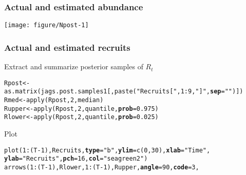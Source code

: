 \documentclass[color=usenames,dvipsnames]{beamer}\usepackage[]{graphicx}\usepackage[]{color}
\makeatletter
\newcommand{\hlnum}[1]{\textcolor[rgb]{0.69,0.494,0}{#1}}%
\newcommand{\hlstr}[1]{\textcolor[rgb]{0.749,0.012,0.012}{#1}}%
\newcommand{\hlopt}[1]{\textcolor[rgb]{0,0,0}{#1}}%
\newcommand{\hlstd}[1]{\textcolor[rgb]{0,0,0}{#1}}%
\newcommand{\hlkwb}[1]{\textcolor[rgb]{0,0.341,0.682}{#1}}%
\newcommand{\hlkwc}[1]{\textcolor[rgb]{0,0,0}{\textbf{#1}}}%
\newcommand{\hlkwd}[1]{\textcolor[rgb]{0.004,0.004,0.506}{#1}}%
\newenvironment{kframe}{%
 \def\at@end@of@kframe{}%
 \ifinner\ifhmode%
  \def\at@end@of@kframe{\end{minipage}}%
  \begin{minipage}{\columnwidth}%
 \fi\fi%
 \def\FrameCommand##1{\hskip\@totalleftmargin \hskip-\fboxsep
 \colorbox{shadecolor}{##1}\hskip-\fboxsep
     \hskip-\linewidth \hskip-\@totalleftmargin \hskip\columnwidth}%
 \MakeFramed {\advance\hsize-\width
   \@totalleftmargin\z@ \linewidth\hsize
   \@setminipage}}%
 {\par\unskip\endMakeFramed%
 \at@end@of@kframe}
\newenvironment{knitrout}{}{} %
\makeatother
\begin{document}
\begin{frame}
  \frametitle{Actual and estimated abundance}
  \begin{center}
    \texttt{[image: figure/Npost-1]}
  \end{center}
\end{frame}






\begin{frame}[fragile]
  \frametitle{Actual and estimated recruits}
  Extract and summarize posterior samples of $R_t$
\begin{knitrout}\scriptsize
{}\color{fgcolor}\begin{kframe}
\begin{alltt}
\hlstd{Rpost} \hlkwb{<-} \hlkwd{as.matrix}\hlstd{(jags.post.samples1[,}\hlkwd{paste}\hlstd{(}\hlstr{"Recruits["}\hlstd{,}\hlnum{1}\hlopt{:}\hlnum{9}\hlstd{,}\hlstr{"]"}\hlstd{,}\hlkwc{sep}\hlstd{=}\hlstr{""}\hlstd{)])}
\hlstd{Rmed} \hlkwb{<-} \hlkwd{apply}\hlstd{(Rpost,} \hlnum{2}\hlstd{, median)}
\hlstd{Rupper} \hlkwb{<-} \hlkwd{apply}\hlstd{(Rpost,} \hlnum{2}\hlstd{, quantile,} \hlkwc{prob}\hlstd{=}\hlnum{0.975}\hlstd{)}
\hlstd{Rlower} \hlkwb{<-} \hlkwd{apply}\hlstd{(Rpost,} \hlnum{2}\hlstd{, quantile,} \hlkwc{prob}\hlstd{=}\hlnum{0.025}\hlstd{)}
\end{alltt}
\end{kframe}
\end{knitrout}
  \pause
  \vfill
  Plot
\begin{knitrout}\scriptsize
{}\color{fgcolor}\begin{kframe}
\begin{alltt}
\hlkwd{plot}\hlstd{(}\hlnum{1}\hlopt{:}\hlstd{(T}\hlopt{-}\hlnum{1}\hlstd{), Recruits,} \hlkwc{type}\hlstd{=}\hlstr{"b"}\hlstd{,} \hlkwc{ylim}\hlstd{=}\hlkwd{c}\hlstd{(}\hlnum{0}\hlstd{,} \hlnum{30}\hlstd{),} \hlkwc{xlab}\hlstd{=}\hlstr{"Time"}\hlstd{,}
     \hlkwc{ylab}\hlstd{=}\hlstr{"Recruits"}\hlstd{,} \hlkwc{pch}\hlstd{=}\hlnum{16}\hlstd{,} \hlkwc{col}\hlstd{=}\hlstr{"seagreen2"}\hlstd{)}
\hlkwd{arrows}\hlstd{(}\hlnum{1}\hlopt{:}\hlstd{(T}\hlopt{-}\hlnum{1}\hlstd{), Rlower,} \hlnum{1}\hlopt{:}\hlstd{(T}\hlopt{-}\hlnum{1}\hlstd{), Rupper,} \hlkwc{angle}\hlstd{=}\hlnum{90}\hlstd{,} \hlkwc{code}\hlstd{=}\hlnum{3}\hlstd{,}

\end{alltt}
\end{kframe}
\end{knitrout}
\end{frame}
\end{document}
